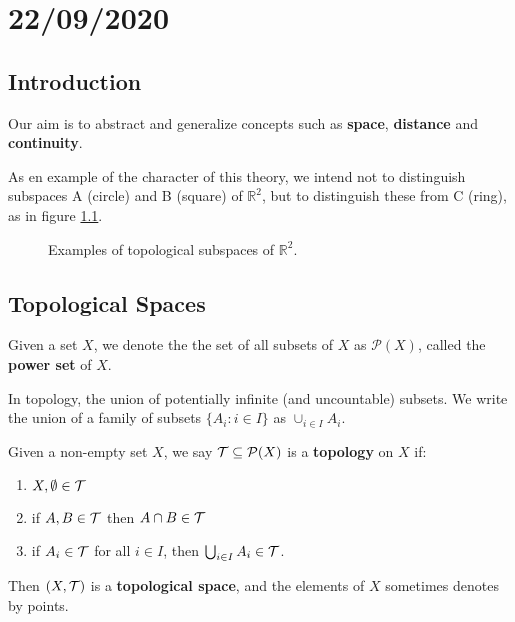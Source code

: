 \documentclass[../../main/main.tex]{subfiles}
\begin{document}
\chapter{22/09/2020}
\label{cpt:lec1}

\section{Introduction}
\label{sec:introduction}

Our aim is to abstract and generalize concepts such as {\bf space}, {\bf distance} and {\bf continuity}.

As en example of the character of this theory, we intend not to distinguish subspaces A (circle) and B (square) of $\mathbb{R}^{2}$, but to distinguish these from C (ring), as in figure \ref{fig:example-1}.

\begin{figure}[ht]
  \centering
  \caption{Examples of topological subspaces of $\mathbb{R}^{2}$.}
  \label{fig:example-1}
\end{figure}

\section{Topological Spaces}
\label{sec:top-spaces}

\begin{definition}
  Given a set $X$, we denote the the set of all subsets of $X$ as $\mathcal{P}(X)$, called the {\bf power set} of $X$.
\end{definition}

In topology, the union of potentially infinite (and uncountable) subsets. We write the union of a family of subsets $\{A_{i} : i \in I\}$ as $\cup_{i \in I} A_{i}$.

\begin{definition}
  \label{def:topology}
  Given a non-empty set $X$, we say $\mathcal{T} \subseteq \mathcal{P}(X)$ is a {\bf topology} on $X$ if:
  \begin{enumerate}
      \item $X, \emptyset \in \mathcal{T}$
      \item if $A, B \in \mathcal{T}$ then $A \cap B \in \mathcal{T}$
      \item if $A_{i} \in \mathcal{T}$ for all $i \in I$, then $\bigcup_{i \in I} A_{i} \in \mathcal{T}$.
  \end{enumerate}
  Then $(X, \mathcal{T})$ is a {\bf topological space}, and the elements of $X$ sometimes denotes by points.
\end{definition}
\end{document}
